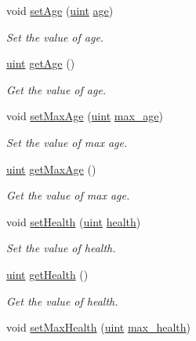 \begin{DoxyCompactItemize}
void \hyperlink{classCreature_a218e2238145d382fb76727618db5d0d1}{set\-Age} (\hyperlink{BasicTypes_8h_a91ad9478d81a7aaf2593e8d9c3d06a14}{uint} \hyperlink{classCreature_aa3544784cbb26961f214a39b49fd171e}{age})
\begin{DoxyCompactList}\small\item\em Set the value of age. \end{DoxyCompactList}\item 
\hyperlink{BasicTypes_8h_a91ad9478d81a7aaf2593e8d9c3d06a14}{uint} \hyperlink{classCreature_a6556cd2825edd90caf6673324e5132d9}{get\-Age} ()
\begin{DoxyCompactList}\small\item\em Get the value of age. \end{DoxyCompactList}\item 
void \hyperlink{classCreature_a0182ce7212cc37901927fc9ebb26a359}{set\-Max\-Age} (\hyperlink{BasicTypes_8h_a91ad9478d81a7aaf2593e8d9c3d06a14}{uint} \hyperlink{classCreature_a57d8397db4c0e505deff7c1d7cead3e1}{max\-\_\-age})
\begin{DoxyCompactList}\small\item\em Set the value of max age. \end{DoxyCompactList}\item 
\hyperlink{BasicTypes_8h_a91ad9478d81a7aaf2593e8d9c3d06a14}{uint} \hyperlink{classCreature_a13258a0b65207bc1a283cd663485cb56}{get\-Max\-Age} ()
\begin{DoxyCompactList}\small\item\em Get the value of max age. \end{DoxyCompactList}\item 
void \hyperlink{classCreature_aaa12115f414e42efcdefff606656a47d}{set\-Health} (\hyperlink{BasicTypes_8h_a91ad9478d81a7aaf2593e8d9c3d06a14}{uint} \hyperlink{classCreature_ab59bc1917022e01b46b23f947bb8d688}{health})
\begin{DoxyCompactList}\small\item\em Set the value of health. \end{DoxyCompactList}\item 
\hyperlink{BasicTypes_8h_a91ad9478d81a7aaf2593e8d9c3d06a14}{uint} \hyperlink{classCreature_a5e75da10542de2031a67f0599f3e6427}{get\-Health} ()
\begin{DoxyCompactList}\small\item\em Get the value of health. \end{DoxyCompactList}\item 
void \hyperlink{classCreature_a3acd6ae2be4e0cc1dd3dd1b2bf539b20}{set\-Max\-Health} (\hyperlink{BasicTypes_8h_a91ad9478d81a7aaf2593e8d9c3d06a14}{uint} \hyperlink{classCreature_a0628a001b2c326388b08ea664e0c4e8f}{max\-\_\-health})

\end{DoxyCompactItemize}
